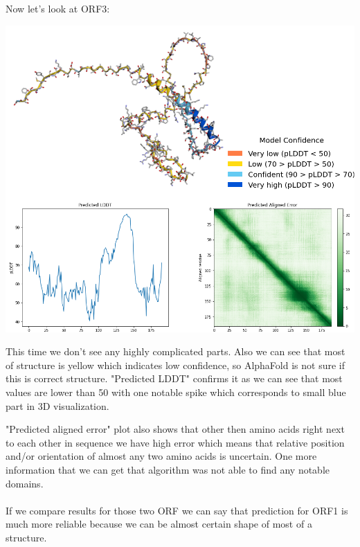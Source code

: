 \documentclass[a4paper]{article}
\begin{document}
	Now let's look at ORF3: 
	
	\centerline{\includegraphics[width=1\textwidth]{orf3}}
	
	This time we don't see any highly complicated parts. Also we can see that most of structure is yellow which indicates low confidence, so AlphaFold is not sure if this is correct structure. "Predicted LDDT" confirms it as we can see that most values are lower than 50 with one notable spike which corresponds to small blue part in 3D visualization.
	
	"Predicted aligned error" plot also shows that other then amino acids right next to each other in sequence we have high error which means that relative position and/or orientation of almost any two amino acids is uncertain. One more information that we can get that algorithm was not able to find any notable domains.
	\\
	\\
	If we compare results for those two ORF we can say that prediction for ORF1 is much more reliable because we can be almost certain shape of most of a structure.
\end{document}
